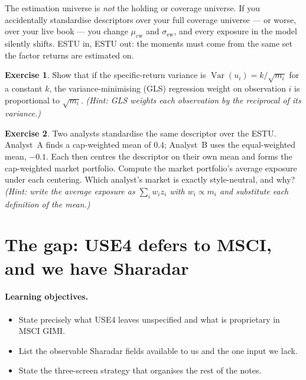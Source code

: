 \documentclass[11pt]{article}
\theoremstyle{definition}
\newtheorem{exercise}{Exercise}[section]
\theoremstyle{plain}
\theoremstyle{remark}
\DeclareMathOperator{\Var}{Var}
\begin{document}
\begin{pitfall}
The estimation universe is \emph{not} the holding or coverage universe. If you accidentally standardise descriptors over your full coverage universe --- or worse, over your live book --- you change $\mu_{\text{cw}}$ and $\sigma_{\text{ew}}$, and every exposure in the model silently shifts. ESTU in, ESTU out: the moments must come from the same set the factor returns are estimated on.
\end{pitfall}

\begin{exercise}
Show that if the specific-return variance is $\Var(u_i)=k/\sqrt{m_i}$ for a constant $k$, the variance-minimising (GLS) regression weight on observation $i$ is proportional to $\sqrt{m_i}$. \emph{(Hint: GLS weights each observation by the reciprocal of its variance.)}
\end{exercise}

\begin{exercise}
Two analysts standardise the same descriptor over the ESTU. Analyst~A finds a cap-weighted mean of $0.4$; Analyst~B uses the equal-weighted mean, $-0.1$. Each then centres the descriptor on their own mean and forms the cap-weighted market portfolio. Compute the market portfolio's average exposure under each centering. Which analyst's market is exactly style-neutral, and why? \emph{(Hint: write the average exposure as $\sum_i w_i z_i$ with $w_i\propto m_i$ and substitute each definition of the mean.)}
\end{exercise}

\section{The gap: USE4 defers to MSCI, and we have Sharadar}\label{sec:gap}

\paragraph{Learning objectives.}
\begin{itemize}[nosep,leftmargin=1.4em]
  \item State precisely what USE4 leaves unspecified and what is proprietary in MSCI GIMI.
  \item List the observable Sharadar fields available to us and the one input we lack.
  \item State the three-screen strategy that organises the rest of the notes.
\end{itemize}
\end{document}
